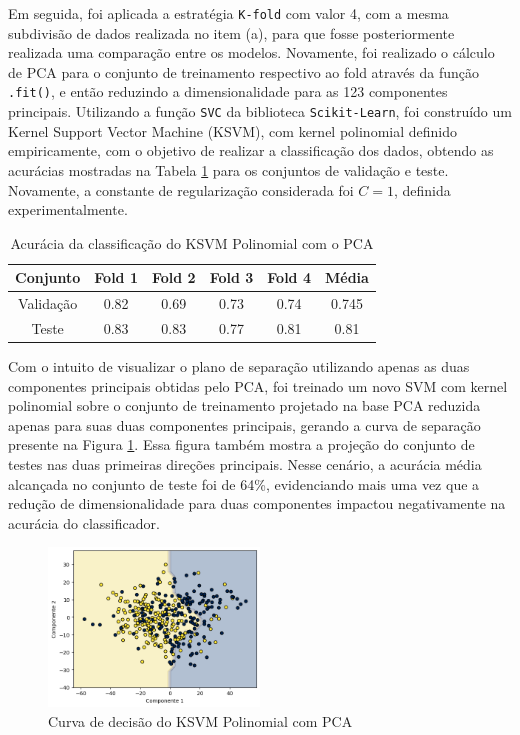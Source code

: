 \documentclass[]{abntex2}
\begin{document}
Em seguida, foi aplicada a estratégia \texttt{K-fold} com valor 4, com a mesma subdivisão de dados realizada no item (a), para que fosse posteriormente realizada uma comparação entre os modelos. Novamente, foi realizado o cálculo de PCA para o conjunto de treinamento respectivo ao fold através da função \texttt{.fit()}, e então reduzindo a dimensionalidade para as 123 componentes principais. Utilizando a função \texttt{SVC} da biblioteca \texttt{Scikit-Learn}, foi construído um Kernel Support Vector Machine (KSVM), com kernel polinomial definido empiricamente, com o objetivo de realizar a classificação dos dados, obtendo as acurácias mostradas na Tabela \ref{tab:pca_svm} para os conjuntos de validação e teste. Novamente, a constante de regularização considerada foi \(C=1\), definida experimentalmente.

\begin{table}[H]
    \centering
    \begin{tabular}{|c|c|c|c|c|c|}
    \hline
    \rowcolor[HTML]{C0C0C0} 
    Conjunto                          & Fold 1 & Fold 2 & Fold 3 & Fold 4 & Média  \\ \hline
    \cellcolor[HTML]{C0C0C0}Validação & 0.82   & 0.69   & 0.73   & 0.74   & 0.745  \\ \hline
    \cellcolor[HTML]{C0C0C0}Teste     & 0.83   & 0.83   & 0.77   & 0.81   & 0.81 \\ \hline
    \end{tabular}
    \caption{Acurácia da classificação do KSVM Polinomial com o PCA}
    \label{tab:pca_svm}
\end{table}

Com o intuito de visualizar o plano de separação utilizando apenas as duas componentes principais obtidas pelo PCA, foi treinado um novo SVM com kernel polinomial sobre o conjunto de treinamento projetado na base PCA reduzida apenas para suas duas componentes principais, gerando a curva de separação presente na Figura \ref{fig:pca_reta}. Essa figura também mostra a projeção do conjunto de testes nas duas primeiras direções principais. Nesse cenário, a acurácia média alcançada no conjunto de teste foi de 64\%, evidenciando mais uma vez que a redução de dimensionalidade para duas componentes impactou negativamente na acurácia do classificador.

\begin{figure}[H]
    \centering 
    \includegraphics[width=0.5\textwidth]{imgs/ex1/pca_reta.png}
    \caption{Curva de decisão do KSVM Polinomial com PCA}
    \label{fig:pca_reta} %
\end{figure}
\end{document}
